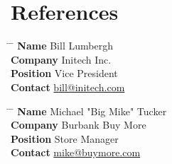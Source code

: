 \documentclass[10pt]{article} %
\newcommand{\reference}[4]{
\parbox[t]{0.5\textwidth}{
\begin{tabbing}
\hspace{2cm} \= \hspace{4cm} \= \kill
\textbf{Name} \> #1\\
\textbf{Company} \> #2\\
\textbf{Position} \> #3\\
\textbf{Contact} \> \href{mailto:{#4}}{#4}
\end{tabbing}
}}
\begin{document}
\section{References}

\parbox{0.5\textwidth}{
\reference
{Bill Lumbergh}
{Initech Inc.}
{Vice President}
{bill@initech.com}
}
%
\hfill
%
\parbox{0.5\textwidth}{
\reference
{Michael "Big Mike" Tucker}
{Burbank Buy More}
{Store Manager}
{mike@buymore.com}
}

\end{document}
